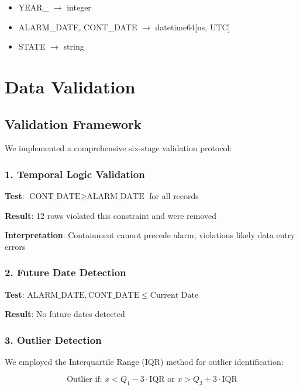 \documentclass[12pt,a4paper]{article}
\begin{document}
\begin{itemize}
    \item YEAR\_ $\rightarrow$ integer
    \item ALARM\_DATE, CONT\_DATE $\rightarrow$ datetime64[ns, UTC]
    \item STATE $\rightarrow$ string
\end{itemize}

\section{Data Validation}

\subsection{Validation Framework}

We implemented a comprehensive six-stage validation protocol:

\subsubsection{1. Temporal Logic Validation}

\textbf{Test}: $\text{CONT\_DATE} \geq \text{ALARM\_DATE}$ for all records

\textbf{Result}: 12 rows violated this constraint and were removed

\textbf{Interpretation}: Containment cannot precede alarm; violations likely data entry errors

\subsubsection{2. Future Date Detection}

\textbf{Test}: $\text{ALARM\_DATE}, \text{CONT\_DATE} \leq \text{Current Date}$

\textbf{Result}: No future dates detected

\subsubsection{3. Outlier Detection}

We employed the Interquartile Range (IQR) method for outlier identification:

\begin{equation}
\text{Outlier if: } x < Q_1 - 3 \cdot \text{IQR} \text{ or } x > Q_3 + 3 \cdot \text{IQR}
\end{equation}
\end{document}
